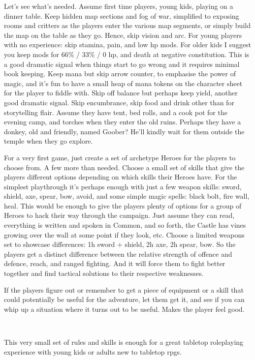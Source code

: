 Let's see what's needed. Assume first time players, young kids, playing on a dinner table. Keep hidden map sections and fog of war, simplified to exposing rooms and critters as the players enter the various map segments, or simply build the map on the table as they go. Hence, skip vision and arc. For young players with no experience: skip stamina, pain, and low hp mods. For older kids I suggest you keep mods for 66\% / 33\% / 0 hp, and death at negative constitution. This is a good dramatic signal when things start to go wrong and it requires minimal book keeping. Keep mana but skip arrow counter, to emphasise the power of magic, and it's fun to have a small heap of mana tokens on the character sheet for the player to fiddle with. Skip off balance but perhaps keep yield, another good dramatic signal. Skip encumbrance, skip food and drink other than for storytelling flair. Assume they have tent, bed rolls, and a cook pot for the evening camp, and torches when they enter the old ruins. Perhaps they have a donkey, old and friendly, named Goober? He'll kindly wait for them outside the temple when they go explore.

For a very first game, just create a set of archetype Heroes for the players to choose from. A few more than needed. Choose a small set of skills that give the players different options depending on which skills their Heroes have. For the simplest playthrough it's perhaps enough with just a few weapon skills: sword, shield, axe, spear, bow, avoid, and some simple magic spells: black bolt, fire wall, heal. This would be enough to give the players plenty of options for a group of Heroes to hack their way through the campaign. Just assume they can read, everything is written and spoken in Common, and so forth, the Castle has vines growing over the wall at some point if they look, etc. Choose a limited weapons set to showcase differences: 1h sword + shield, 2h axe, 2h spear, bow. So the players get a distinct difference between the relative strength of offence and defence, reach, and ranged fighting. And it will force them to fight better together and find tactical solutions to their respective weaknesses.

If the players figure out or remember to get a piece of equipment or a skill that could potentially be useful for the adventure, let them get it, and see if you can whip up a situation where it turns out to be useful. Makes the player feel good.

\

\noindent This very small set of rules and skills is enough for a great tabletop roleplaying experience with young kids or adults new to tabletop rpgs.


